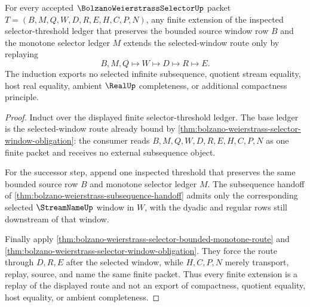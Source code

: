 \begin{theorem}
\label{thm:bolzano-weierstrass-selector-finite-window-induction}
For every accepted $\BolzanoWeierstrassSelectorUp$ packet $T=(B,M,Q,W,D,R,E,H,C,P,N)$, any finite extension of the inspected selector-threshold ledger that preserves the bounded source window row $B$ and the monotone selector ledger $M$ extends the selected-window route only by replaying
$$
B,M,Q \longmapsto W \longmapsto D \longmapsto R \longmapsto E .
$$
The induction exports no selected infinite subsequence, quotient stream equality, host real equality, ambient $\RealUp$ completeness, or additional compactness principle.
\end{theorem}
\begin{proof}
Induct over the displayed finite selector-threshold ledger. The base ledger is the selected-window route already bound by \autoref{thm:bolzano-weierstrass-selector-window-obligation}: the consumer reads $B,M,Q,W,D,R,E,H,C,P,N$ as one finite packet and receives no external subsequence object.

For the successor step, append one inspected threshold that preserves the same bounded source row $B$ and monotone selector ledger $M$. The subsequence handoff of \autoref{thm:bolzano-weierstrass-subsequence-handoff} admits only the corresponding selected $\StreamNameUp$ window in $W$, with the dyadic and regular rows still downstream of that window.

Finally apply \autoref{thm:bolzano-weierstrass-selector-bounded-monotone-route} and \autoref{thm:bolzano-weierstrass-selector-window-obligation}. They force the route through $D,R,E$ after the selected window, while $H,C,P,N$ merely transport, replay, source, and name the same finite packet. Thus every finite extension is a replay of the displayed route and not an export of compactness, quotient equality, host equality, or ambient completeness.
\end{proof}

